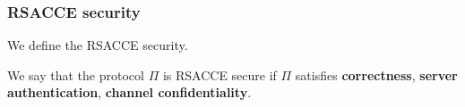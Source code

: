 \subsubsection{RSACCE security}
We define the RSACCE security.

\begin{definition}
 We say that the protocol $\Pi$ is RSACCE secure
 if $\Pi$ satisfies \textbf{correctness},
 \textbf{server authentication},
 \textbf{channel confidentiality}.
\end{definition}